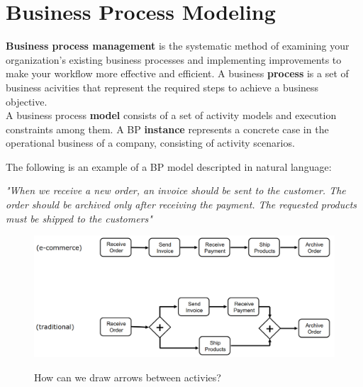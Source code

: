 \chapter{Business Process Modeling}
\textbf{Business process management} is the systematic method of examining your organization's existing business processes and implementing improvements to make your workflow more effective and efficient.
A business \textbf{process} is a set of business acivities that represent the required steps to achieve a business objective.\\
A business process \textbf{model} consists of a set of activity models and execution constraints among them.
A BP \textbf{instance} represents a concrete case in the operational business of a company, consisting of activity scenarios.

The following is an example of a BP model descripted in natural language:
\begin{center}
   \textit{"When we receive a new order, an invoice should be sent to the customer. The order should be archived only after receiving the payment. The requested products must be shipped to the customers"}
\end{center}
\begin{paracol}{2}
   \colfill
   \colfill
   \switchcolumn
   
   \begin{figure}[htbp]
      \centering
      \caption{How can we draw arrows between activies?}
      \includegraphics[width=0.95\columnwidth]{images/bp_activiesflow.png}
      \label{fig:bp_activiesflow}
   \end{figure}
\end{paracol}

